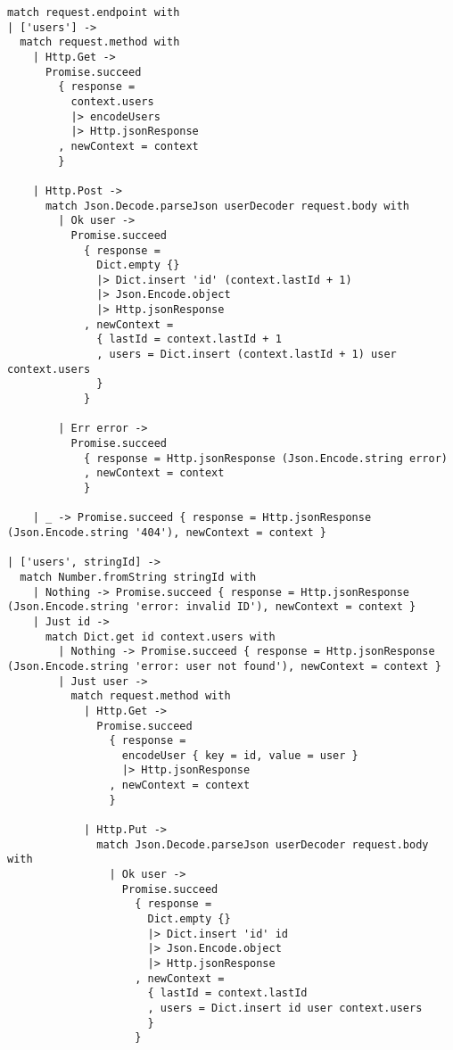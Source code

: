 \begin{lstlisting}[label={code:routes},caption={Roteamento da aplicação base}]
match request.endpoint with
| ['users'] -> 
  match request.method with
    | Http.Get ->
      Promise.succeed
        { response =
          context.users
          |> encodeUsers
          |> Http.jsonResponse
        , newContext = context
        }
    
    | Http.Post ->
      match Json.Decode.parseJson userDecoder request.body with
        | Ok user ->
          Promise.succeed
            { response = 
              Dict.empty {}
              |> Dict.insert 'id' (context.lastId + 1)
              |> Json.Encode.object
              |> Http.jsonResponse 
            , newContext =
              { lastId = context.lastId + 1
              , users = Dict.insert (context.lastId + 1) user context.users 
              }
            }
        
        | Err error ->
          Promise.succeed
            { response = Http.jsonResponse (Json.Encode.string error)
            , newContext = context
            }

    | _ -> Promise.succeed { response = Http.jsonResponse (Json.Encode.string '404'), newContext = context }

| ['users', stringId] ->
  match Number.fromString stringId with
    | Nothing -> Promise.succeed { response = Http.jsonResponse (Json.Encode.string 'error: invalid ID'), newContext = context }
    | Just id ->
      match Dict.get id context.users with
        | Nothing -> Promise.succeed { response = Http.jsonResponse (Json.Encode.string 'error: user not found'), newContext = context }
        | Just user ->
          match request.method with
            | Http.Get ->
              Promise.succeed
                { response =
                  encodeUser { key = id, value = user }
                  |> Http.jsonResponse
                , newContext = context
                }
            
            | Http.Put ->
              match Json.Decode.parseJson userDecoder request.body with
                | Ok user ->
                  Promise.succeed
                    { response = 
                      Dict.empty {}
                      |> Dict.insert 'id' id
                      |> Json.Encode.object
                      |> Http.jsonResponse 
                    , newContext =
                      { lastId = context.lastId
                      , users = Dict.insert id user context.users 
                      }
                    }
        

\end{lstlisting}
